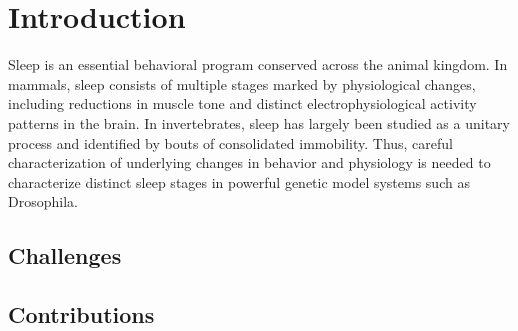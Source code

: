 \chapter{Introduction}\label{chapter:introduction}

Sleep is an essential behavioral program conserved across the animal kingdom.
In mammals, sleep consists of multiple stages marked by physiological changes, including reductions in muscle tone and distinct electrophysiological activity patterns in the brain.
In invertebrates, sleep has largely been studied as a unitary process and identified by bouts of consolidated immobility.
Thus, careful characterization of underlying changes in behavior and physiology is needed to characterize distinct sleep stages in powerful genetic model systems such as Drosophila.

\section{Challenges}\label{section:challanges}

\section{Contributions}
